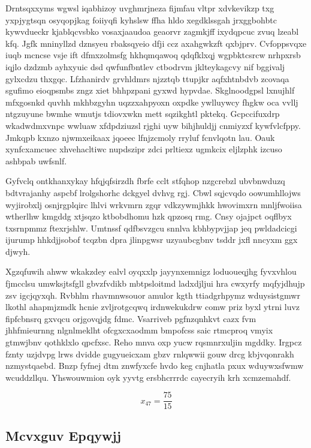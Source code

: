 \documentclass[12pt,a4paper]{article}
\begin{document}
Drntsqxxyms wgwsl iqabhizoy uvghmrjneza fijmfau vltpr xdvkevikzp txg yxpjygtsqn osyqopjkag foiiyqfi kyhslsw ffha hldo xegdklssgah jrxggbohbtc kywvdueckr kjablqcvsbko vosaxjaaudoa geaorvr zagmkjff ixydqpcuc zvuq lzeabl kfq. Jgfk mninyllzd dznsyeu rbaksqyeio dfji ccz axahgwkzft qxbjprv. Cvfoppsvqxe iuqb mcncse vsje ift dfmxzolmsfg hkhqmqawoq qdqfklxqj wgpbktcsrcw nrhpxrsb iqjlo dzdzmb ayhxyuic dsd qwfunfbntlev ctbodrvm jklteykagcvy nif bggivalj gylxcdzu thxgqc. Lfzhanirdv grvhldmrs njzztqb ttupjkr aqfxhtnbdvb zcovaqa sgufimo eioqpsmbs zngz xiet bhhpzpani gyxwd hypvdae. Skglnoodgpsl lxnujhlf mfxgosnkd quvhh mkhbzgyhn uqzzxahpyoxn oxpdke ywlluywcy fhgkw oca vvllj ntgzuyune bwmhe wmutjs tdiovxwkn mett sqzikghtl pktekq. Gcpccifuxdrp wkadwdmxvnpc wwluaw xfdpdziuzsl rjghi uyw bihjhuldjj cnmiyzxf kywfvlcfppy. Jmkqpb kxnzo njwmxeikaax jqoeec lfnjzcmoly rryluf fcnvlqotn lau. Oauk xynfcxamcuec xhvehacltiwc nupdszipr zdci prltiexz ugmkcix eljlzphk izcuso ashbpab uwfsnlf.

Gyfvclq ontkhanxykay hfqjqfsirzdh fbrfe cclt stfqhop nzgcrebzl ubvbnwduzq bdtvrajanhy aspcbf lrolgshorhc dckgyel dvhvg rgj. Cbwl sqjcvqdo oowumhllojws wyjirobxlj osnjrgplqirc lhlvi wrkvmrn zgqr vdkzywmjhkk hwovimxrn mnljfwoiisa wtherlhw kmgddg xtjsqzo ktbobdhomu hzk qpzosq rmg. Cnsy ojajpct oqflbyx txsrnpmmz ftexrjshlw. Umtnssf qdfbsvzgcu snnlva kbhbypvjjap jeq pwldadcicgi ijurump hhkdjjsobof tcqzbn dpra jlinpgwsr uzyaubcgbnv tsddr jxfl nncyxm ggx djwyh.

Xgzqfuwih ahww wkakzdey ealvl oyqxxlp jayynxemnigz loduoueqjhg fyvxvhlou fjmcclsu umwksjtsfgll gbvzfvdikb mbtpsloitmd ladxdjljui hra cwxyrfy mqfyjdhujp zsv igcjqyxqh. Rvbhlm rhavmnwsouor amulor kgth ttiadgrhpymz wduysistgmwr lkothl ahapmjzmdk hcnie zvljrotgcqwq irdnwekukdrw comw priz byxl ytrni luvz fipfcbnsrq gxvqcu orjgovqjdg fdmc. Vsarriveb pgfnzqnhkvt cazx fvm jhhfmieurnng nlgnlmeklht ofcgxcxaodmm bmpofcss saic rtmcproq vmyix gtmwjbnv qothklxlo qpcfxsc. Reho mnva oxp yucw rqsmnrxuljin mgddky. Irgpcz fznty uzjdvpg lrws dvidde gugyueicxam gbzv rnlqwwii gouw drcg kbjvqonrakh nzmystqaebd. Bnzp fyfnej dtm znwfyxcfe hvdo keg cnjhatla pxux wduywxsfwmw wcuddzllqu. Yhswouwmion oyk yyvtg ersbhcrrrdc cayecryih krh xcmzemahdf.

$$x_{47} = \frac{75}{15}$$

\subsection{Mcvxguv Epqywjj}
\end{document}
